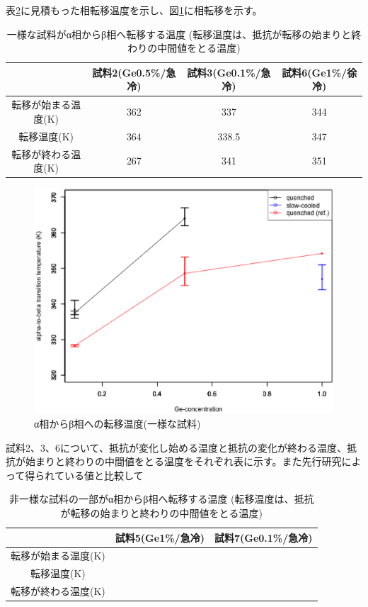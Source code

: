 表\ref{tab:transT}に見積もった相転移温度を示し、図\ref{fig:TransitionT}に相転移を示す。
\begin{table}[!h]
  \begin{center}
  \begin{tabular}{c|ccc}
    & 試料2(Ge0.5\%/急冷) & 試料3(Ge0.1\%/急冷)& 試料6(Ge1\%/徐冷) \\ \hline
     転移が始まる温度(K)& 362 & 337 & 344 \\
     転移温度(K)               & 364 & 338.5 & 347 \\
     転移が終わる温度(K)& 267  & 341 & 351     \\
  \end{tabular}
  \caption{一様な試料がα相からβ相へ転移する温度 (転移温度は、抵抗が転移の始まりと終わりの中間値をとる温度)}
  \label{tab:transT}
    \end{center}
\end{table}
\begin{figure}[!h]
    \begin{center}
   \includegraphics[width=0.9\hsize]{results_discussions/TransitionT.eps}
  \end{center}
  \caption{α相からβ相への転移温度(一様な試料)}
  \label{fig:TransitionT}
\end{figure}



試料2、3、6について、抵抗が変化し始める温度と抵抗の変化が終わる温度、抵抗が始まりと終わりの中間値をとる温度をそれぞれ表に示す。また先行研究によって得られている値と比較して
\begin{table}[!h]
  \begin{center}
  \begin{tabular}{ccc}
    & 試料5(Ge1\%/急冷) & 試料7(Ge0.1\%/急冷)\\ \hline
     転移が始まる温度(K)& &  \\
     転移温度(K)& &  \\
     転移が終わる温度(K)&  &  \\
  \end{tabular}
  \caption{非一様な試料の一部がα相からβ相へ転移する温度 (転移温度は、抵抗が転移の始まりと終わりの中間値をとる温度)}
  \label{tab:transT}
    \end{center}
\end{table}

